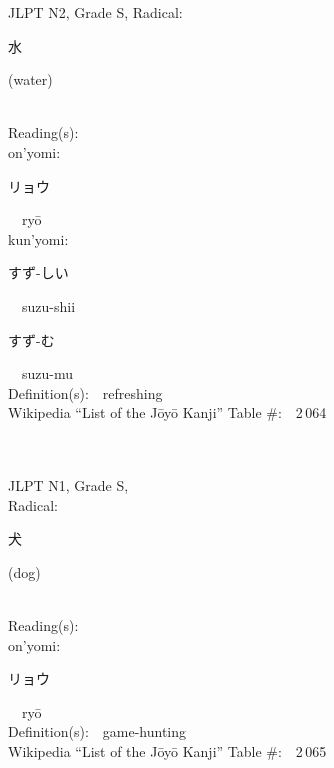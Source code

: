 \begin{multicols}{2}
{JLPT N2, Grade S, Radical:\ \ {\begin{CJK}{UTF8}{min} 水 \end{CJK}} (water) } \\
Reading(s):\ \ \\
{\hspace*{1em}}on'yomi:\ \ \\
{\hspace*{2em}}{\begin{CJK}{UTF8}{min} リョウ \end{CJK}}\ \ ry\=o\ \ \\
{\hspace*{1em}}kun'yomi:\ \ \\
{\hspace*{2em}}{\begin{CJK}{UTF8}{min} すず-しい \end{CJK}}\ \ suzu-shii\ \ \\
{\hspace*{2em}}{\begin{CJK}{UTF8}{min} すず-む \end{CJK}}\ \ suzu-mu\ \ \\
Definition(s):\ \ refreshing \\
Wikipedia ``List of the J\=oy\=o Kanji'' Table \#:\ \ 2\,064 \\
\ \ \\
{\fontsize{34pt}{40pt}  }\ \ \\
{JLPT N1, Grade S, \\Radical:\ \ {\begin{CJK}{UTF8}{min} 犬 \end{CJK}} (dog) } \\
Reading(s):\ \ \\
{\hspace*{1em}}on'yomi:\ \ \\
{\hspace*{2em}}{\begin{CJK}{UTF8}{min} リョウ \end{CJK}}\ \ ry\=o\ \ \\
Definition(s):\ \ game-hunting \\
Wikipedia ``List of the J\=oy\=o Kanji'' Table \#:\ \ 2\,065 \\
\ \ \\
{\fontsize{34pt}{40pt}  }\ \ \\

\end{multicols}
